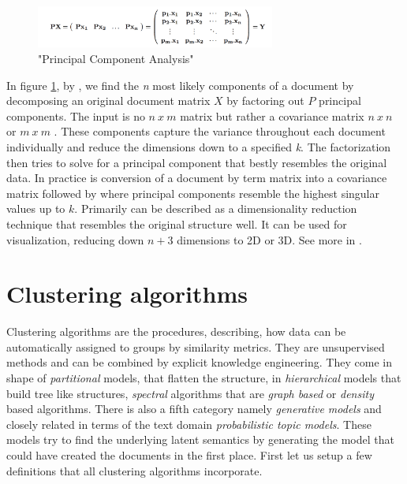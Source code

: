     \begin{figure}[h!]
      \centering
        \includegraphics[width=0.7\textwidth]{PCA.png}
        \caption{"Principal Component Analysis"}
        \label{pca}
    \end{figure}

    In figure \ref{pca}, by \cite{PCA2009}, we find the \emph{n} most likely components of a document by decomposing an original document matrix $X$ by factoring out $P$ principal components. The input is no $n\:x\:m$ matrix but rather a covariance matrix $n\:x\:n$ or $m\:x\:m$ . These components capture the variance throughout each document individually and reduce the dimensions down to a specified \emph{k}. The factorization then tries to solve for a principal component that bestly resembles the original data. In practice \pca{} is conversion of a document by term matrix into a covariance matrix followed by \svd{} where principal components resemble the highest singular values up to $k$. Primarily \pca{} can be described as a dimensionality reduction technique that resembles the original structure well. It can be used for visualization, reducing down $n + 3$ dimensions to 2D or 3D. See more in \cite{PCA2009}.

\section{Clustering algorithms}
\label{sec:clustering}
  
  Clustering algorithms are the procedures, describing, how data can be automatically assigned to groups by similarity metrics. They are unsupervised methods and can be combined by explicit knowledge engineering. They come in shape of \emph{partitional} models, that flatten the structure, in \emph{hierarchical} models that build tree like structures, \emph{spectral} algorithms that are \emph{graph based} or \emph{density} based algorithms. There is also a fifth category namely \emph{generative models} and closely related in terms of the text domain \emph{probabilistic topic models}. These models try to find the underlying latent semantics by generating the model that could have created the documents in the first place. First let us setup a few definitions that all clustering algorithms incorporate.

